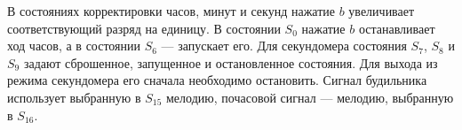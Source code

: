 В состояниях корректировки часов, минут и секунд нажатие $b$ увеличивает
соответствующий разряд на единицу. В состоянии $S_0$ нажатие $b$ останавливает
ход часов, а в состоянии $S_6$ --- запускает его. Для секундомера состояния
$S_7$, $S_8$ и $S_9$ задают сброшенное, запущенное и остановленное состояния.
Для выхода из режима секундомера его сначала необходимо остановить.
Сигнал будильника использует выбранную в $S_{15}$ мелодию, почасовой сигнал ---
мелодию, выбранную в $S_{16}$.

